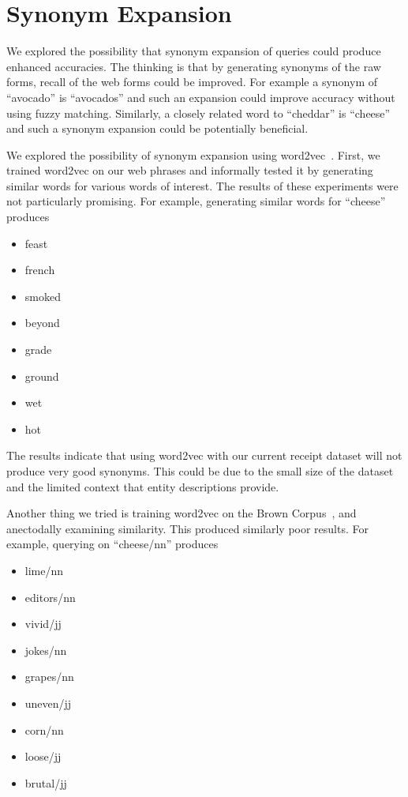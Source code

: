 \documentclass[11pt,a4paper]{article}
\newenvironment{myitemize}
{ \begin{itemize}
    \setlength{\itemsep}{0pt}
    \setlength{\parskip}{0pt}
    \setlength{\parsep}{0pt}     }
{ \end{itemize}                  }
\begin{document}
\section{Synonym Expansion}
We explored the possibility that synonym expansion of queries
could produce enhanced accuracies.  The thinking is that by
generating synonyms of the raw forms, recall of the web forms
could be improved.  For example a synonym of ``avocado'' is
``avocados'' and such an expansion could improve accuracy without
using fuzzy matching.  Similarly, a closely related word to
``cheddar'' is ``cheese'' and such a synonym expansion could be
potentially beneficial.

We explored the possibility of synonym expansion using
word2vec~\cite{NIPS2013_5021}.  First, we trained word2vec on our web
phrases and informally tested it by generating similar words for
various words of interest.  The results of these experiments were
not particularly promising.  For example, generating similar words for
``cheese'' produces
\begin{myitemize}
\item feast
\item french
\item smoked
\item beyond
\item grade
\item ground
\item wet
\item hot
\end{myitemize}  

The results indicate that using word2vec with our current receipt
dataset will not produce very good synonyms.  This could be due
to the small size of the dataset and the limited context that
entity descriptions provide.

Another thing we tried is training word2vec on the Brown
Corpus~\cite{francis79browncorpus}, and anectodally examining
similarity.  This produced similarly poor results.  For example,
querying on ``cheese/nn'' produces
\begin{myitemize}
\item lime/nn
\item editors/nn
\item vivid/jj
\item jokes/nn
\item grapes/nn
\item uneven/jj
\item corn/nn
\item loose/jj
\item brutal/jj
\end{myitemize}  
\end{document}
